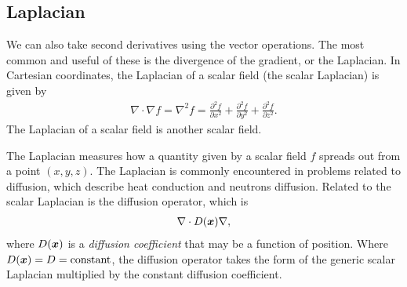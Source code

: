 \subsection{Laplacian}

We can also take second derivatives using the vector operations. The most common and useful of these is the divergence of the gradient, or the Laplacian. In Cartesian coordinates, the Laplacian of a scalar field (the scalar Laplacian) is given by
\begin{align}
  \nabla \cdot \nabla f = \nabla^2 f = 
  \frac{\partial^2 f}{ \partial x^2 } + \frac{\partial^2 f}{ \partial y^2 } + \frac{\partial^2 f}{ \partial z^2 } .
\end{align}
The Laplacian of a scalar field is another scalar field.

The Laplacian measures how a quantity given by a scalar field $f$ spreads out from a point $(x,y,z)$. The Laplacian is commonly encountered in problems related to diffusion, which describe heat conduction and neutrons diffusion. Related to the scalar Laplacian is the diffusion operator, which is
\begin{align}
  \nabla \cdot D(\bm{x}) \nabla,
\end{align}
where $D(\bm{x})$ is a \emph{diffusion coefficient} that may be a function of position. Where $D(\bm{x}) = D = \text{constant}$, the diffusion operator takes the form of the generic scalar Laplacian multiplied by the constant diffusion coefficient.

